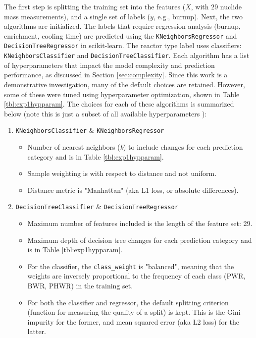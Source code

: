The first step is splitting the training set into the features ($X$, with 29
nuclide mass measurements), and a single set of labels ($y$, e.g., burnup).
Next, the two algorithms are initialized.  The labels that require regression
analysis (burnup, enrichment, cooling time) are predicted using the
\texttt{KNeighborsRegressor} and \texttt{DecisionTreeRegressor} in
scikit-learn. The reactor type label uses classifiers:
\texttt{KNeighborsClassifier} and \texttt{DecisionTreeClassifier}.  Each
algorithm has a list of hyperparameters that impact the model complexity and
prediction performance, as discussed in Section \ref{sec:complexity}. Since
this work is a demonstrative investigation, many of the default choices are
retained. However, some of these were tuned using hyperparameter optimization,
shown in Table \ref{tbl:exp1hypparam}.  The choices for each of these
algorithms is summarized below (note this is just a subset of all available
hyperparameters \cite{scikit}):
\begin{enumerate}
  \item \texttt{KNeighborsClassifier} \& \texttt{KNeighborsRegressor}
    \begin{itemize}
      \item Number of nearest neighbors (\textit{k}) to include changes for 
            each prediction category and is in Table \ref{tbl:exp1hypparam}.
      \item Sample weighting is with respect to distance and not uniform.
      \item Distance metric is "Manhattan" (aka L1 loss, or absolute 
            differences).
    \end{itemize}
  \item \texttt{DecisionTreeClassifier} \& \texttt{DecisionTreeRegressor}
    \begin{itemize}
      \item Maximum number of features included is the length of the feature 
            set: 29.
      \item Maximum depth of decision tree changes for each prediction category
            and is in Table \ref{tbl:exp1hypparam}.
      \item For the classifier, the \texttt{class\_weight} is "balanced", 
            meaning that the weights are inversely proportional to the frequency
            of each class (\gls{PWR}, \gls{BWR}, \gls{PHWR}) in the training set.
      \item For both the classifier and regressor, the default splitting criterion
            (function for measuring the quality of a split) is kept. This is the 
            Gini impurity for the former, and mean squared error (aka L2 loss) 
            for the latter.
    \end{itemize}
\end{enumerate}

